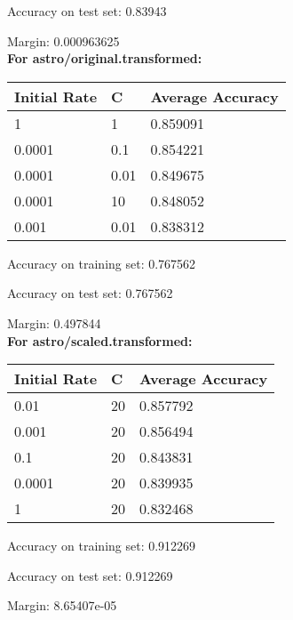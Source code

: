 \documentclass[12pt]{exam}
\begin{document}
\begin{itemize}
\begin{solution}
Accuracy on test set: 0.83943


Margin: 0.000963625\\

\textbf{For astro/original.transformed:}\\
\begin{center}
\begin{tabular}{lll} \hline
\textbf{Initial Rate } & \textbf{C} & \textbf{Average Accuracy}\\ \hline
1 &                      1&                       0.859091\\
0.0001  &                0.1 &                    0.854221\\
0.0001 &                 0.01 &                   0.849675\\
0.0001&                  10    &                 0.848052\\
0.001&                   0.01   &                 0.838312
\end{tabular}
\end{center}

Accuracy on training set: 0.767562

Accuracy on test set: 0.767562


Margin: 0.497844\\

\textbf{For astro/scaled.transformed:}\\
\begin{center}
\begin{tabular}{lll} \hline
\textbf{Initial Rate } & \textbf{C} & \textbf{Average Accuracy}\\ \hline
0.01 &                   20  &                    0.857792\\
0.001   &                20  &                    0.856494\\
0.1      &               20    &                  0.843831\\
0.0001   &               20     &                 0.839935\\
1        &               20     &                 0.832468
\end{tabular}
\end{center}

Accuracy on training set: 0.912269

Accuracy on test set: 0.912269


Margin: 8.65407e-05
\end{solution}
\end{itemize}
\end{document}

